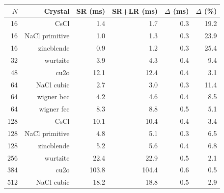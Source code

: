 \begin{tabular}{r | r r r r r}
\toprule
               $N$  &             Crystal  &             SR (ms)  &          SR+LR (ms)  &       $\Delta$ (ms)  &       $\Delta$ (\%) \\ 
\midrule
                16  &                CsCl  &           \num{1.4}  &           \num{1.7}  &           \num{0.3}  &          \num{19.2} \\ 
                16  &      NaCl primitive  &           \num{1.0}  &           \num{1.3}  &           \num{0.3}  &          \num{23.9} \\ 
                16  &          zincblende  &           \num{0.9}  &           \num{1.2}  &           \num{0.3}  &          \num{25.4} \\ 
                32  &            wurtzite  &           \num{3.9}  &           \num{4.3}  &           \num{0.4}  &           \num{9.4} \\ 
                48  &                cu2o  &          \num{12.1}  &          \num{12.4}  &           \num{0.4}  &           \num{3.1} \\ 
                64  &          NaCl cubic  &           \num{2.7}  &           \num{3.0}  &           \num{0.3}  &          \num{11.4} \\ 
                64  &          wigner bcc  &           \num{4.2}  &           \num{4.6}  &           \num{0.4}  &           \num{8.5} \\ 
                64  &          wigner fcc  &           \num{8.3}  &           \num{8.8}  &           \num{0.5}  &           \num{5.1} \\ 
               128  &                CsCl  &          \num{10.1}  &          \num{10.4}  &           \num{0.4}  &           \num{3.4} \\ 
               128  &      NaCl primitive  &           \num{4.8}  &           \num{5.1}  &           \num{0.3}  &           \num{6.5} \\ 
               128  &          zincblende  &           \num{5.2}  &           \num{5.6}  &           \num{0.4}  &           \num{6.8} \\ 
               256  &            wurtzite  &          \num{22.4}  &          \num{22.9}  &           \num{0.5}  &           \num{2.1} \\ 
               384  &                cu2o  &         \num{103.8}  &         \num{104.4}  &           \num{0.6}  &           \num{0.5} \\ 
               512  &          NaCl cubic  &          \num{18.2}  &          \num{18.8}  &           \num{0.5}  &           \num{2.9} \\ 

\end{tabular}
